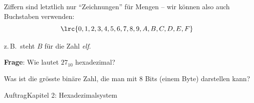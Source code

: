 \begin{frame}
Ziffern sind letztlich nur \enquote{Zeichnungen} für Mengen -- wir können also auch Buchstaben verwenden:
$$\lrc{0,1,2,3,4,5,6,7,8,9,A,B,C,D,E,F}$$
\begin{center}
z.\,B.\ steht $B$ für die Zahl \textit{elf}.
\end{center}
\vspace{3mm}
\begin{center}
\textbf{Frage}: Wie lautet $27_{10}$ hexadezimal?
\end{center}
\end{frame}

\begin{frame}
\begin{center}
Was ist die grösste binäre Zahl, die man mit 8 Bits (einem Byte) darstellen kann?
\end{center}
\end{frame}

\begin{frame}{Auftrag}{Kapitel 2: Hexadezimalsystem}
\vspace{3mm}
\end{frame}


